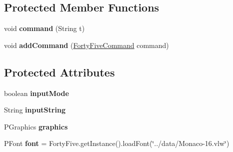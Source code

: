 \subsection*{Protected Member Functions}
\begin{DoxyCompactItemize}
\item 
\hypertarget{classdev_1_1boxy_1_1fortyfive_1_1core_1_1commandline_1_1_command_line_a54ebc417a3aba6527c34895362c7e7a7}{
void {\bfseries command} (String t)}
\label{d6/dfd/classdev_1_1boxy_1_1fortyfive_1_1core_1_1commandline_1_1_command_line_a54ebc417a3aba6527c34895362c7e7a7}

\item 
\hypertarget{classdev_1_1boxy_1_1fortyfive_1_1core_1_1commandline_1_1_command_line_acd4e369e8c97099dad0b59c61e1bc6a4}{
void {\bfseries addCommand} (\hyperlink{interfacedev_1_1boxy_1_1fortyfive_1_1core_1_1commandline_1_1_forty_five_command}{FortyFiveCommand} command)}
\label{d6/dfd/classdev_1_1boxy_1_1fortyfive_1_1core_1_1commandline_1_1_command_line_acd4e369e8c97099dad0b59c61e1bc6a4}

\end{DoxyCompactItemize}
\subsection*{Protected Attributes}
\begin{DoxyCompactItemize}
\item 
\hypertarget{classdev_1_1boxy_1_1fortyfive_1_1core_1_1commandline_1_1_command_line_a00f07d7f667bd5f032fc2a293fff7729}{
boolean {\bfseries inputMode}}
\label{d6/dfd/classdev_1_1boxy_1_1fortyfive_1_1core_1_1commandline_1_1_command_line_a00f07d7f667bd5f032fc2a293fff7729}

\item 
\hypertarget{classdev_1_1boxy_1_1fortyfive_1_1core_1_1commandline_1_1_command_line_afdf7166e7af2777d81a7192032c5109d}{
String {\bfseries inputString}}
\label{d6/dfd/classdev_1_1boxy_1_1fortyfive_1_1core_1_1commandline_1_1_command_line_afdf7166e7af2777d81a7192032c5109d}

\item 
\hypertarget{classdev_1_1boxy_1_1fortyfive_1_1core_1_1commandline_1_1_command_line_a60a621c7b003faf7b56b273c7941519f}{
PGraphics {\bfseries graphics}}
\label{d6/dfd/classdev_1_1boxy_1_1fortyfive_1_1core_1_1commandline_1_1_command_line_a60a621c7b003faf7b56b273c7941519f}

\item 
\hypertarget{classdev_1_1boxy_1_1fortyfive_1_1core_1_1commandline_1_1_command_line_a7ca9f341090df2b81a4226ca812d8f47}{
PFont {\bfseries font} = FortyFive.getInstance().loadFont(\char`\"{}../data/Monaco-\/16.vlw\char`\"{})}
\label{d6/dfd/classdev_1_1boxy_1_1fortyfive_1_1core_1_1commandline_1_1_command_line_a7ca9f341090df2b81a4226ca812d8f47}

\end{DoxyCompactItemize}
